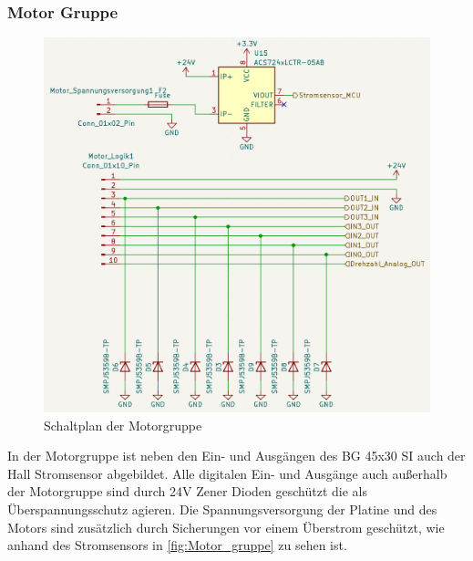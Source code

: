 \subsubsection{Motor Gruppe}
\begin{figure}[H]
	\centering
	\includegraphics[width=1.0\textwidth]{images/Hardware/Motor_Schaltplan.PNG}
	\caption{Schaltplan der Motorgruppe}
	\label{fig:Motor_gruppe}
\end{figure}
In der Motorgruppe ist neben den Ein- und Ausgängen des BG 45x30 SI auch der Hall Stromsensor abgebildet. Alle digitalen Ein- und Ausgänge auch außerhalb der Motorgruppe sind durch 24V Zener Dioden geschützt die als Überspannungsschutz agieren. Die Spannungsversorgung der Platine und des Motors sind zusätzlich durch Sicherungen vor einem Überstrom geschützt, wie anhand des Stromsensors in \autoref{fig:Motor_gruppe} zu sehen ist.
